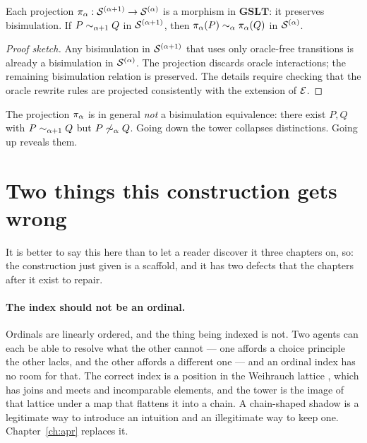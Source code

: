 \begin{proposition}
Each projection $\pi_{\alpha} : \mathcal{S}^{(\alpha+1)} \to \mathcal{S}^{(\alpha)}$
is a morphism in $\mathbf{GSLT}$: it preserves bisimulation.
If $P \sim_{\alpha+1} Q$ in $\mathcal{S}^{(\alpha+1)}$, then
$\pi_{\alpha}(P) \sim_\alpha \pi_{\alpha}(Q)$ in $\mathcal{S}^{(\alpha)}$.
\end{proposition}

\begin{proof}[Proof sketch]
Any bisimulation in $\mathcal{S}^{(\alpha+1)}$ that uses only oracle-free
transitions is already a bisimulation in $\mathcal{S}^{(\alpha)}$.
The projection discards oracle interactions; the remaining
bisimulation relation is preserved.
The details require checking that the oracle rewrite rules are
projected consistently with the extension of $\mathcal{E}$.
\end{proof}

\begin{remark}
The projection $\pi_{\alpha}$ is in general \emph{not} a
bisimulation equivalence: there exist $P, Q$ with
$P \sim_{\alpha+1} Q$ but $P \not\sim_\alpha Q$.
Going down the tower collapses distinctions.
Going up reveals them.
\end{remark}



\section{Two things this construction gets wrong}
\label{sec:tower-wrong}

It is better to say this here than to let a reader discover it three
chapters on, so: the construction just given is a scaffold, and it has
two defects that the chapters after it exist to repair.

\paragraph{The index should not be an ordinal.}
Ordinals are linearly ordered, and the thing being indexed is not.
Two agents can each be able to resolve what the other cannot --- one
affords a choice principle the other lacks, and the other affords a
different one --- and an ordinal index has no room for that.
The correct index is a position in the Weihrauch lattice
\cite{weihrauch}, which has joins and meets and incomparable elements,
and the tower is the image of that lattice under a map that flattens it
into a chain.
A chain-shaped shadow is a legitimate way to introduce an intuition and
an illegitimate way to keep one.
Chapter~\ref{ch:apr} replaces it.

